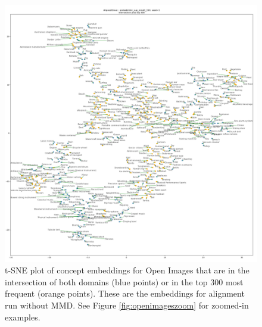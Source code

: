 \begin{figure}[H]
    \centering
    \includegraphics[width=\textwidth]{images/results/intersection_top300_tsne_openimages_probabilistic_sup_mmd0_150_AlignedGlove_1.png}
    \caption{
        \label{fig:openimagesaligned}
        t-SNE plot of concept embeddings for Open Images that are in the intersection of both domains (blue points) or in the top 300 most frequent (orange points). These are the embeddings for alignment run without MMD. See Figure \ref{fig:openimageszoom} for zoomed-in examples. 
    }
\end{figure}

